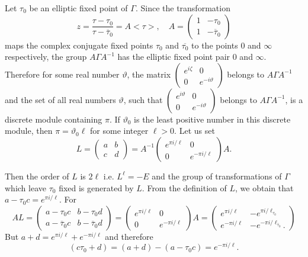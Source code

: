 Let $\tau_0$ be an elliptic fixed point of $\Gamma$. Since the
transformation 
$$
z=\frac{\tau -\tau_0}{\tau-\overline{\tau}_0} = A<\tau>, \quad A
= \begin{pmatrix}
1 & -\tau_0\\
1 & -\overline{\tau}_0
\end{pmatrix}
$$
maps the complex conjugate fixed points $\tau_0$ and
$\overline{\tau_0}$ to the points $0$ and $\infty$ respectively, the
group $A\Gamma A^{-1}$ has the elliptic fixed point pair 0 and
$\infty$. Therefore for some real number $\vartheta$, the matrix
$\left(\begin{smallmatrix} e^{i\zeta} & 0\\ 0 &
  e^{-i\vartheta}\end{smallmatrix} \right)$ belongs to $A\Gamma
A^{-1}$ and the set of all real numbers $\vartheta$, such that
$\left(\begin{smallmatrix} e^{i\vartheta}& 0\\ 0 &
  e^{-i\vartheta}\end{smallmatrix} \right)$ belongs to $A\Gamma
A^{-1}$, is a discrete module containing $\pi$. If $\vartheta_0$ is
the least positive number in this discrete module, then $\pi =
\vartheta_0\ell$ for \pageoriginale some integer $\ell >0$. Let us set 
$$
L =\begin{pmatrix}
a&b\\c&d
\end{pmatrix} = A^{-1}\begin{pmatrix}
e^{\pi i /\ell} & 0\\
0 & e^{-\pi i /\ell}
\end{pmatrix} A.
$$

Then the order of $L$ is $2\ell$ i.e. $L^{\ell}=-E$ and the group of
transformations of $\Gamma$ which leave $\tau_0$ fixed is generated by
$L$. From the definition of $L$, we obtain that $a-\tau_0c=e^{\pi
i/\ell}$. For
$$
AL = \begin{pmatrix}
a-\tau_0 c & b-\tau_0d\\
a-\overline{\tau}_0 c & b - \overline{\tau}_0 d
\end{pmatrix} = \begin{pmatrix}
e^{\pi i /\ell} & 0\\
0 & e^{-\pi i /\ell}
\end{pmatrix} A = \begin{pmatrix}
e^{\pi i/\ell} & -e^{\pi i/\ell_{\tau_0}}\\
e^{-\pi i /\ell} & -e^{-\pi i/\ell_{\overline{\tau}_0}}. 
\end{pmatrix}
$$
But $a+d=e^{\pi i /\ell} + e^{-\pi i /\ell}$ and therefore 
$$
(c\tau_0+d) = (a+d) -(a-\tau_0c) = e^{-\pi i /\ell}.
$$

